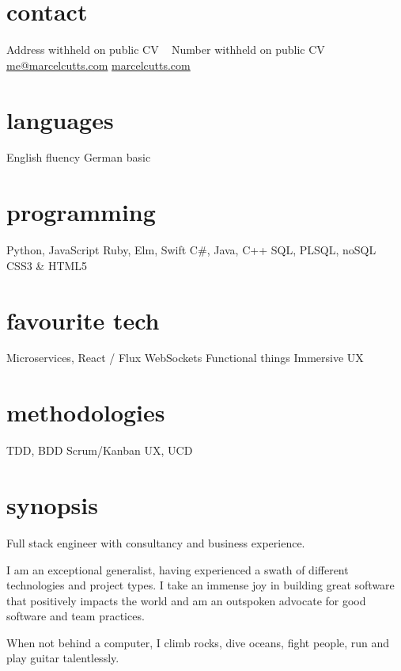 \documentclass[]{friggeri-cv} %
\begin{document}


\begin{aside} %
\section{contact}
Address withheld on public CV
~
Number withheld on public CV
~
\href{mailto:me@marcelcutts.com}{me@marcelcutts.com}
\href{http://www.marcelcutts.com}{marcelcutts.com}
\section{languages}
English fluency
German basic
\section{programming}
Python, JavaScript
Ruby, Elm, Swift
C\#, Java, C++
SQL, PLSQL, noSQL
CSS3 \& HTML5
\section{favourite tech}
Microservices,
React / Flux
WebSockets
Functional things
Immersive UX
\section{methodologies}
TDD, BDD
Scrum/Kanban
UX, UCD
\end{aside}


\section{synopsis}

Full stack engineer with consultancy and business experience.

I am an exceptional generalist, having experienced a swath of different technologies and project types. I take an immense joy in building great software that positively impacts the world and am an outspoken advocate for good software and team practices.

When not behind a computer, I climb rocks, dive oceans, fight people, run and play guitar talentlessly.
\end{document}
